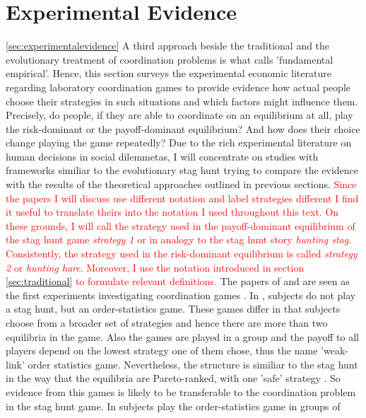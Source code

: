 \documentclass[11pt]{article}
\begin{document}
\section{Experimental Evidence}
\ref{sec:experimentalevidence}
A third approach beside the traditional and the evolutionary treatment of coordination problems is what \cite{camerer} calls 'fundamental empirical'.
Hence, this section surveys the experimental economic literature regarding 
laboratory coordination games to provide evidence how actual people choose
their strategies in such situations and which factors might influence them. 
Precisely, do people, if they are able to coordinate on an equilibrium at all,
play the risk-dominant or the payoff-dominant equilibrium? And how does their
choice change playing the game repeatedly?
Due to the rich experimental literature on human decisions in social dilemmetas, I will concentrate on studies with frameworks similiar to the evolutionary stag hunt trying to compare the evidence with the results of the theoretical approaches outlined in previous sections. 
\textcolor{red}{Since the papers I will discuss use different notation and 
label strategies different I find it useful to translate theirs into the
notation I used throughout this text. On these grounds, I will call the 
strategy used in the payoff-dominant equilibrium of the stag hunt game
\textit{strategy 1} or in analogy to the stag hunt story \textit{hunting stag}.
Consistently, the strategy used in the risk-dominant equilibrium is called
\textit{strategy 2} or \textit{hunting hare}. Moreover, I use the notation
introduced in section \ref{sec:traditional} to formulate relevant definitions.}
The papers of \textcite{van_huyck_tacit_1990} and \textcite{cooper_communication_1992} are 
seen as the first experiments investigating coordination games \parencite{devetag_when_2007}.
In \textcite{van_huyck_tacit_1990}, subjects do not play a stag
hunt, but an order-statistics game. These games differ in that subjects choose
from a broader set of strategies and hence there are more than two equilibria
in the game. Also the games are played in a group and the payoff to all 
players depend on the lowest strategy one of them chose, thus the name 
'weak-link' order statistics game. Nevertheless, the structure is similiar to 
the stag hunt in the way that the equilibria are Pareto-ranked, with one 
'safe' strategy \parencite{devetag_when_2007}. So evidence from this games is likely to 
be transferable to the coordination problem in the stag hunt game. In 
\cite{van_huyck_tacit_1990} subjects play the order-statistics game in groups of 
\end{document}

